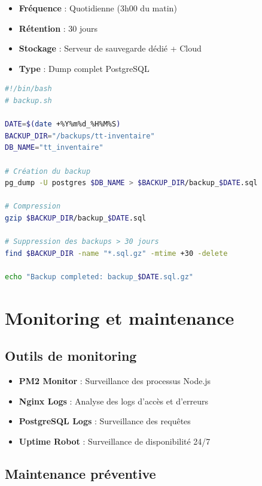 \begin{itemize}
    \item \textbf{Fréquence} : Quotidienne (3h00 du matin)
    \item \textbf{Rétention} : 30 jours
    \item \textbf{Stockage} : Serveur de sauvegarde dédié + Cloud
    \item \textbf{Type} : Dump complet PostgreSQL
\end{itemize}

\begin{lstlisting}[language=bash, caption=Script de sauvegarde automatique]
#!/bin/bash
# backup.sh

DATE=$(date +%Y%m%d_%H%M%S)
BACKUP_DIR="/backups/tt-inventaire"
DB_NAME="tt_inventaire"

# Création du backup
pg_dump -U postgres $DB_NAME > $BACKUP_DIR/backup_$DATE.sql

# Compression
gzip $BACKUP_DIR/backup_$DATE.sql

# Suppression des backups > 30 jours
find $BACKUP_DIR -name "*.sql.gz" -mtime +30 -delete

echo "Backup completed: backup_$DATE.sql.gz"
\end{lstlisting}

\section{Monitoring et maintenance}

\subsection{Outils de monitoring}

\begin{itemize}
    \item \textbf{PM2 Monitor} : Surveillance des processus Node.js
    \item \textbf{Nginx Logs} : Analyse des logs d'accès et d'erreurs
    \item \textbf{PostgreSQL Logs} : Surveillance des requêtes
    \item \textbf{Uptime Robot} : Surveillance de disponibilité 24/7
\end{itemize}

\subsection{Maintenance préventive}

